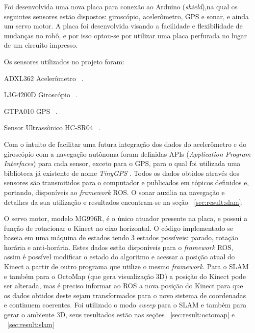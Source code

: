
Foi desenvolvida uma nova placa para conexão ao Arduino (\textit{shield}),na qual os seguintes sensores estão dispostos: giroscópio, acelerômetro, GPS e sonar, e ainda um servo motor. A placa foi desenvolvida visando a facilidade e flexibilidade de mudanças no robô, e por isso optou-se por utilizar uma placa perfurada no lugar de um circuito impresso. 

Os sensores utilizados no projeto foram:
\begin{compactitem}
	\item ADXL362 Acelerômetro ~\cite{acelerometro}.
	\item L3G4200D Giroscópio ~\cite{giroscopio}.
	\item GTPA010 GPS ~\cite{gps}.
	\item Sensor Ultrassônico HC-SR04 ~\cite{sonar}.
\end{compactitem}

Com o intuito de facilitar uma futura integração dos dados do acelerômetro e do giroscópio com a navegação autônoma foram definidas APIs (\textit{Application Program Interfaces}) para cada sensor, exceto para o GPS, para o qual foi utilizada uma biblioteca já existente de nome \textit{TinyGPS} \cite{tinyGPS}. Todos os dados obtidos através dos sensores são transmitidos para o computador e publicados em tópicos definidos e, portando, disponíveis ao \textit{framework} ROS. O sonar auxilia na navegação e detalhes da sua utilização e resultados encontram-se na seção ~\ref{sec:result:slam}.

O servo motor, modelo MG996R,  é o único atuador presente na placa, e possui a função de rotacionar o Kinect no eixo horizontal. O código implementado se baseia em uma máquina de estados tendo 3 estados possíveis: parado, rotação horária e anti-horária. Estes dados estão disponíveis para o \textit{framework} ROS, assim é possível modificar o estado do algoritmo e acessar a posição atual do Kinect a partir de outro programa que utilize o mesmo \textit{framework}. Para o SLAM e também para o OctoMap (que gera visualização 3D) a posição do Kinect pode ser alterada, mas é preciso informar ao ROS a nova posição do Kinect para que os dados obtidos deste sejam transformados para o novo sistema de coordenadas e continuem coerentes. Foi utilizado o modo \textit{sweep} para o SLAM e também para gerar o ambiente 3D, seus resultados estão nas seções ~\ref{sec:result:octomap} e ~\ref{sec:result:slam}

